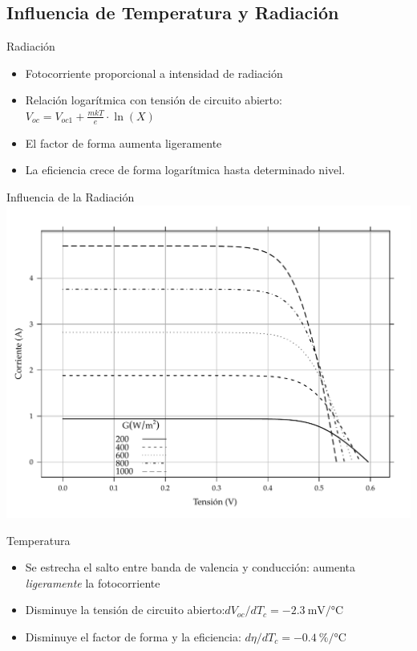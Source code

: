 \documentclass[xcolor={usenames,svgnames,dvipsnames}]{beamer}
\begin{document}
\subsection{Influencia de Temperatura y Radiación}
\label{sec-3-3}

\begin{frame}[label=sec-3-3-1]{Radiación}
\begin{itemize}
\item Fotocorriente proporcional a intensidad de radiación

\item Relación logarítmica con tensión de circuito abierto:
$V_{oc}=V_{oc1}+\frac{mkT}{e}\cdot\ln(X)$

\item El factor de forma aumenta ligeramente

\item La eficiencia crece de forma logarítmica hasta determinado nivel.
\end{itemize}
\end{frame}

\begin{frame}[label=sec-3-3-2]{Influencia de la Radiación}
\includegraphics[width=.9\linewidth]{../figs/CurvaIV_Ta20.pdf}
\end{frame}

\begin{frame}[label=sec-3-3-3]{Temperatura}
\begin{itemize}
\item Se estrecha el salto entre banda de valencia y conducción: aumenta
\emph{ligeramente} la fotocorriente

\item Disminuye la tensión de circuito
abierto:$dV_{oc}/dT_{c}=\SI{-2.3}{\milli\volt\per\celsius}$

\item Disminuye el factor de forma y la eficiencia:
$d\eta/dT_{c}=\SI{-0.4}{\percent\per\celsius}$
\end{itemize}
\end{frame}
\end{document}
